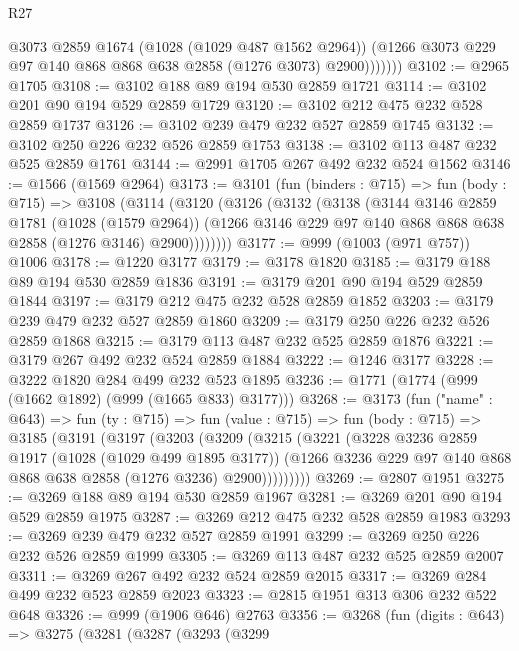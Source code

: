 \begin{lexlean}{R27}
\begin{coremodule}
                @3073
                @2859
                @1674
                (@1028 (@1029 @487 @1562 @2964))
                (@1266 @3073 @229 @97 @140 @868 @868 @638 @2858 (@1276 @3073) @2900)))))))
@3102 := @2965 @1705
@3108 := @3102 @188 @89 @194 @530 @2859 @1721
@3114 := @3102 @201 @90 @194 @529 @2859 @1729
@3120 := @3102 @212 @475 @232 @528 @2859 @1737
@3126 := @3102 @239 @479 @232 @527 @2859 @1745
@3132 := @3102 @250 @226 @232 @526 @2859 @1753
@3138 := @3102 @113 @487 @232 @525 @2859 @1761
@3144 := @2991 @1705 @267 @492 @232 @524 @1562
@3146 := @1566 (@1569 @2964)
@3173 := @3101
    (fun (binders : @715) =>
    fun (body : @715) =>
    @3108
      (@3114
        (@3120
          (@3126
            (@3132
              (@3138
                (@3144
                  @3146
                  @2859
                  @1781
                  (@1028 (@1579 @2964))
                  (@1266 @3146 @229 @97 @140 @868 @868 @638 @2858 (@1276 @3146) @2900))))))))
@3177 := @999 (@1003 (@971 @757)) @1006
@3178 := @1220 @3177
@3179 := @3178 @1820
@3185 := @3179 @188 @89 @194 @530 @2859 @1836
@3191 := @3179 @201 @90 @194 @529 @2859 @1844
@3197 := @3179 @212 @475 @232 @528 @2859 @1852
@3203 := @3179 @239 @479 @232 @527 @2859 @1860
@3209 := @3179 @250 @226 @232 @526 @2859 @1868
@3215 := @3179 @113 @487 @232 @525 @2859 @1876
@3221 := @3179 @267 @492 @232 @524 @2859 @1884
@3222 := @1246 @3177
@3228 := @3222 @1820 @284 @499 @232 @523 @1895
@3236 := @1771 (@1774 (@999 (@1662 @1892) (@999 (@1665 @833) @3177)))
@3268 := @3173
    (fun ("name" : @643) =>
    fun (ty : @715) =>
    fun (value : @715) =>
    fun (body : @715) =>
    @3185
      (@3191
        (@3197
          (@3203
            (@3209
              (@3215
                (@3221
                  (@3228
                    @3236
                    @2859
                    @1917
                    (@1028 (@1029 @499 @1895 @3177))
                    (@1266 @3236 @229 @97 @140 @868 @868 @638 @2858 (@1276 @3236) @2900)))))))))
@3269 := @2807 @1951
@3275 := @3269 @188 @89 @194 @530 @2859 @1967
@3281 := @3269 @201 @90 @194 @529 @2859 @1975
@3287 := @3269 @212 @475 @232 @528 @2859 @1983
@3293 := @3269 @239 @479 @232 @527 @2859 @1991
@3299 := @3269 @250 @226 @232 @526 @2859 @1999
@3305 := @3269 @113 @487 @232 @525 @2859 @2007
@3311 := @3269 @267 @492 @232 @524 @2859 @2015
@3317 := @3269 @284 @499 @232 @523 @2859 @2023
@3323 := @2815 @1951 @313 @306 @232 @522 @648
@3326 := @999 (@1906 @646) @2763
@3356 := @3268
    (fun (digits : @643) =>
    @3275
      (@3281
        (@3287
          (@3293
            (@3299

\end{coremodule}
\end{lexlean}
